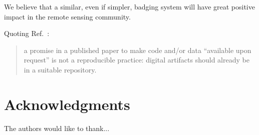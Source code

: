 \documentclass[journal,twopage]{IEEEtran}
\begin{document}
We believe that a similar, even if simpler, badging system will have great positive impact in the remote sensing community.

Quoting Ref.~\cite{PraxisofReproducibleComputationalScience}:
\begin{quote}
a promise in a published paper
to make code and/or data ``available upon
request'' is not a reproducible practice: digital
artifacts should already be in a suitable repository.
\end{quote}
	
\section*{Acknowledgments}
The authors would like to thank...
	
\nocite{StatisticalAnalysesReproducibleResearch,%
RRComputationalHarmonicAnalysis,%
RREconometrics,%
RRSignalProcessing,%
AddressingNeedDataCodeSharingComputationalScience,%
ReproducibleResearchinComputationalScience,%
TenRulesReproducibleComputationalResearch,%
AddressingNeedDataCodeSharingComputationalScience,
SevenReasonsWhyaUsersGuidetoTransparencyandReproducibility,%
OutoftheBoxReproducibilityaSurveyofMachineLearningPlatforms,%
ReproducibilityofScientificResults2018,%
ReproducibleResearchandGIScienceanEvaluationUsingAGILEConferencePapers,%
TheStateofReproducibilityintheComputationalGeosciences}
	


	

	
\end{document}
